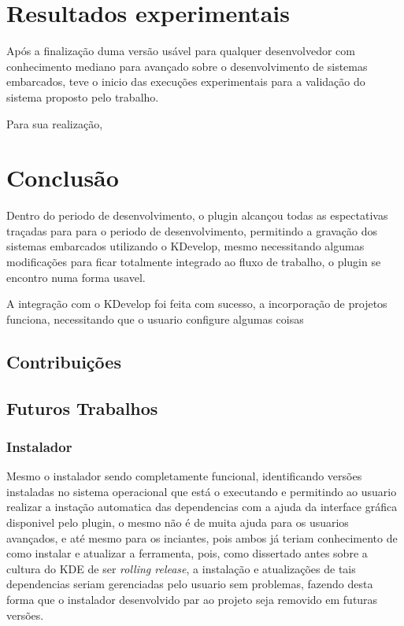 \chapter{Resultados experimentais}
Após a finalização duma versão usável para qualquer desenvolvedor com conhecimento mediano para avançado sobre o desenvolvimento de
sistemas embarcados, teve o inicio das execuções experimentais para a validação do sistema proposto pelo trabalho.

Para sua realização,


\chapter{Conclusão}
Dentro do periodo de desenvolvimento, o plugin alcançou todas as espectativas traçadas para para o periodo de desenvolvimento,
permitindo a gravação dos sistemas embarcados utilizando o KDevelop, mesmo necessitando algumas modificações para ficar
totalmente integrado ao fluxo de trabalho, o plugin se encontro numa forma usavel.

A integração com o KDevelop foi feita com sucesso, a incorporação de projetos funciona, necessitando que o usuario configure algumas
coisas

\section{Contribuições}

\section{Futuros Trabalhos}


\subsection{Instalador}
Mesmo o instalador sendo completamente funcional, identificando versões instaladas no sistema operacional que está o executando e
permitindo ao usuario realizar a instação automatica das dependencias com a ajuda da interface gráfica disponivel pelo plugin,
o mesmo não é de muita ajuda para os usuarios avançados, e até mesmo para os inciantes, pois ambos já teriam conhecimento de como
instalar e atualizar a ferramenta, pois, como dissertado antes sobre a cultura do KDE de ser \textit{rolling release}, a
instalação e atualizações de tais dependencias seriam gerenciadas pelo usuario sem problemas, fazendo desta forma que o instalador
desenvolvido par ao projeto seja removido em futuras versões.

